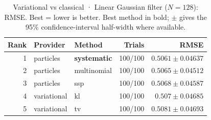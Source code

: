 \begin{table}[!htbp]
\centering
\small
\caption{Variational vs classical · Linear Gaussian filter ($N=128$): RMSE. Best = lower is better. Best method in bold; $\pm$ gives the 95\% confidence-interval half-width where available.}
\label{tab:variational-vs-classical-linear-gaussian-filter-rmse}
\begin{tabular}{rllrr}
\toprule
Rank & Provider & Method & Trials & RMSE \\
\midrule
1 & particles & \textbf{systematic} & 100/100 & $\mathbf{0.5061 \pm 0.04637}$ \\
2 & particles & multinomial & 100/100 & $0.5065 \pm 0.04512$ \\
3 & particles & ssp & 100/100 & $0.5068 \pm 0.04587$ \\
4 & variational & kl & 100/100 & $0.507 \pm 0.04685$ \\
5 & variational & tv & 100/100 & $0.5081 \pm 0.04693$ \\
\bottomrule
\end{tabular}
\end{table}
